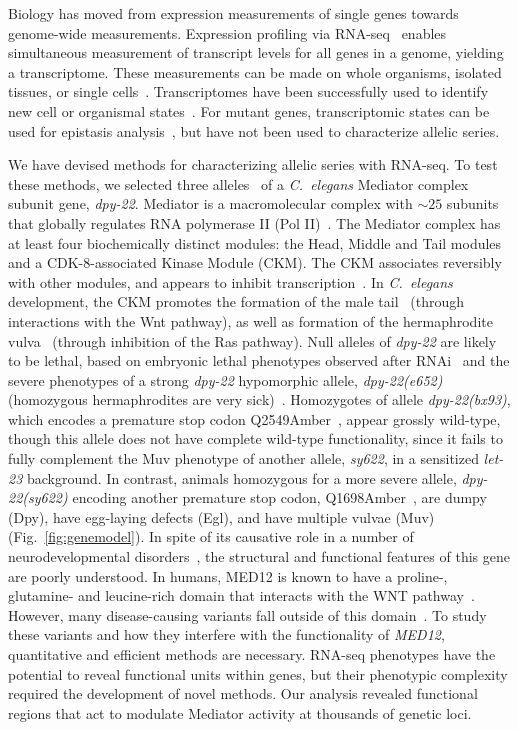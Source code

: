 \documentclass[9pt,twocolumn,twoside]{gsajnl}
\newcommand{\cel}{\emph{C.~elegans}}
\newcommand{\gene}[1]{\mbox{\emph{#1}}}
\newcommand{\protein}[1]{\mbox{\uppercase{#1}}}
\newcommand{\dpy}[1]{\gene{dpy-22#1}}
\begin{document}
Biology has moved from expression measurements of single genes towards
genome-wide measurements. Expression profiling via RNA-seq~\citep{Mortazavi2008}
enables simultaneous measurement of transcript levels for all genes in a genome,
yielding a transcriptome. These measurements can be made on whole organisms,
isolated tissues, or single cells~\citep{Tang2009,Schwarz2012}. Transcriptomes
have been successfully used to identify new cell or organismal
states~\citep{Angeles-Albores2017,Villani2017}. For mutant genes, transcriptomic
states can be used for epistasis analysis~\citep{Dixit2016,AngelesAlboresHIF},
but have not been used to characterize allelic series.

We have devised methods for characterizing allelic series with RNA-seq. To test
these methods, we selected three alleles~\citep{Zhang2000,Moghal2003} of a
\cel{} Mediator complex subunit gene, \dpy{}. Mediator is a macromolecular
complex with $\sim25$ subunits~\citep{Jeronimo2017} that globally regulates RNA
polymerase II (Pol II)~\citep{Allen2015,Takagi2006}. The Mediator complex has at
least four biochemically distinct modules: the Head, Middle and Tail modules and
a CDK-8-associated Kinase Module (CKM). The CKM associates reversibly with other
modules, and appears to inhibit transcription~\citep{Knuesel2009,Elmlund2006}.
In \cel{} development, the CKM promotes the formation of the male
tail~\citep{Zhang2000} (through interactions with the Wnt pathway), as well as
formation of the hermaphrodite vulva~\citep{Moghal2003} (through inhibition of
the Ras pathway). Null alleles of \dpy{} are likely to be lethal, based on
embryonic lethal phenotypes observed after RNAi~\citep{Wang2004,Lehner2006} and
the severe phenotypes of a strong \dpy{} hypomorphic allele, \gene{dpy-22(e652)}
(homozygous hermaphrodites are very sick)~\citep{Riddle1997}. Homozygotes of
allele \gene{dpy-22(bx93)}, which encodes a premature stop codon
Q2549Amber~\citep{Zhang2000}, appear grossly wild-type, though this allele does
not have complete wild-type functionality, since it fails to fully complement
the Muv phenotype of another allele, \emph{sy622}, in a sensitized \emph{let-23}
background. In contrast, animals homozygous for a more severe allele,
\gene{dpy-22(sy622)} encoding another premature stop codon,
Q1698Amber~\citep{Moghal2003}, are dumpy (Dpy), have egg-laying defects (Egl),
and have multiple vulvae (Muv) (Fig.~\ref{fig:genemodel}). In spite of its
causative role in a number of neurodevelopmental disorders~\citep{Graham2013},
the structural and functional features of this gene are poorly understood. In
humans, \protein{MED12} is known to have a proline-, glutamine- and leucine-rich
domain that interacts with the WNT pathway~\citep{Kim2006}. However, many
disease-causing variants fall outside of this domain~\citep{Yamamoto2015}. To
study these variants and how they interfere with the functionality of
\gene{MED12}, quantitative and efficient methods are necessary. RNA-seq
phenotypes have the potential to reveal functional units within genes, but their
phenotypic complexity required the development of novel methods. Our analysis
revealed functional regions that act to modulate Mediator activity at thousands
of genetic loci.
\end{document}
